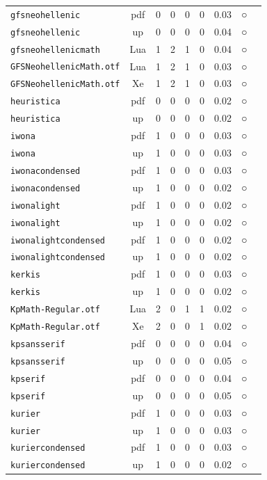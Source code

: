 \begin{longtable}{@{}lcrrrrrcl@{}}
\texttt{gfsneohellenic} & pdf & 0 & 0 & 0 & 0 & 0.03 & ○ & \\
\texttt{gfsneohellenic} & up & 0 & 0 & 0 & 0 & 0.04 & ○ & \\
\texttt{gfsneohellenicmath} & Lua & 1 & 2 & 1 & 0 & 0.04 & ○ & \\
\texttt{GFSNeohellenicMath.otf} & Lua & 1 & 2 & 1 & 0 & 0.03 & ○ & \\
\texttt{GFSNeohellenicMath.otf} & Xe & 1 & 2 & 1 & 0 & 0.03 & ○ & \\
\texttt{heuristica} & pdf & 0 & 0 & 0 & 0 & 0.02 & ○ & \\
\texttt{heuristica} & up & 0 & 0 & 0 & 0 & 0.02 & ○ & \\
\texttt{iwona} & pdf & 1 & 0 & 0 & 0 & 0.03 & ○ & \\
\texttt{iwona} & up & 1 & 0 & 0 & 0 & 0.03 & ○ & \\
\texttt{iwonacondensed} & pdf & 1 & 0 & 0 & 0 & 0.03 & ○ & \\
\texttt{iwonacondensed} & up & 1 & 0 & 0 & 0 & 0.02 & ○ & \\
\texttt{iwonalight} & pdf & 1 & 0 & 0 & 0 & 0.02 & ○ & \\
\texttt{iwonalight} & up & 1 & 0 & 0 & 0 & 0.02 & ○ & \\
\texttt{iwonalightcondensed} & pdf & 1 & 0 & 0 & 0 & 0.02 & ○ & \\
\texttt{iwonalightcondensed} & up & 1 & 0 & 0 & 0 & 0.02 & ○ & \\
\texttt{kerkis} & pdf & 1 & 0 & 0 & 0 & 0.03 & ○ & \\
\texttt{kerkis} & up & 1 & 0 & 0 & 0 & 0.02 & ○ & \\
\texttt{KpMath-Regular.otf} & Lua & 2 & 0 & 1 & 1 & 0.02 & ○ & \\
\texttt{KpMath-Regular.otf} & Xe & 2 & 0 & 0 & 1 & 0.02 & ○ & \\
\texttt{kpsansserif} & pdf & 0 & 0 & 0 & 0 & 0.04 & ○ & \\
\texttt{kpsansserif} & up & 0 & 0 & 0 & 0 & 0.05 & ○ & \\
\texttt{kpserif} & pdf & 0 & 0 & 0 & 0 & 0.04 & ○ & \\
\texttt{kpserif} & up & 0 & 0 & 0 & 0 & 0.05 & ○ & \\
\texttt{kurier} & pdf & 1 & 0 & 0 & 0 & 0.03 & ○ & \\
\texttt{kurier} & up & 1 & 0 & 0 & 0 & 0.03 & ○ & \\
\texttt{kuriercondensed} & pdf & 1 & 0 & 0 & 0 & 0.03 & ○ & \\
\texttt{kuriercondensed} & up & 1 & 0 & 0 & 0 & 0.02 & ○ & \\

\end{longtable}
